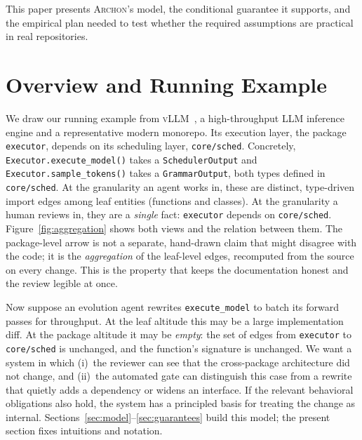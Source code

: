 \documentclass[sigconf,review,anonymous]{acmart}
\theoremstyle{plain}
\theoremstyle{definition}
\begin{document}
This paper presents \textsc{Archon}'s model, the conditional guarantee it
supports, and the empirical plan needed to test whether the required assumptions
are practical in real repositories.

\section{Overview and Running Example}\label{sec:overview}

We draw our running example from \textsc{vLLM}~\cite{kwon2023vllm}, a
high-throughput LLM inference engine and a representative modern monorepo. Its
execution layer, the package \texttt{executor}, depends on its scheduling layer,
\texttt{core/sched}. Concretely, \texttt{Executor.execute\_model()} takes a
\texttt{SchedulerOutput} and \texttt{Executor.sample\_tokens()} takes a
\texttt{GrammarOutput}, both types defined in \texttt{core/sched}. At the
granularity an agent works in, these are distinct, type-driven import edges
among leaf entities (functions and classes). At the granularity a human reviews
in, they are a \emph{single} fact: \texttt{executor} depends on
\texttt{core/sched}. Figure~\ref{fig:aggregation} shows both views and the
relation between them. The package-level arrow is not a separate, hand-drawn
claim that might disagree with the code; it is the \emph{aggregation} of the
leaf-level edges, recomputed from the source on every change. This is the
property that keeps the documentation honest and the review legible at once.

Now suppose an evolution agent rewrites \texttt{execute\_model} to batch its
forward passes for throughput. At the leaf altitude this may be a large
implementation diff. At the package altitude it may be \emph{empty}: the set of
edges from \texttt{executor} to \texttt{core/sched} is unchanged, and the
function's signature is unchanged. We want a system in which
(i)~the reviewer can see that the cross-package architecture did not change, and
(ii)~the automated gate can distinguish this case from a rewrite that quietly
adds a dependency or widens an interface. If the relevant behavioral obligations
also hold, the system has a principled basis for treating the change as internal.
Sections~\ref{sec:model}--\ref{sec:guarantees} build this model; the present
section fixes intuitions and notation.
\end{document}
